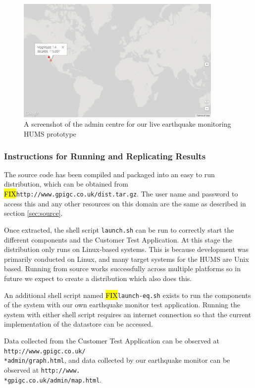 \documentclass[10pt,a4paper]{article}
\begin{document}
\begin{figure}[h!]
  \centering
  \includegraphics[width=10cm]{images/plotearthquakes.png}
  \caption{A screenshot of the admin centre for our live earthquake monitoring HUMS prototype}
  \label{fig:plotearthquakes}
\end{figure}

\subsubsection{Instructions for Running and Replicating Results}
The source code has been compiled and packaged into an easy to run distribution, which can be obtained from \hl{FIX}\verb+http://www.gpigc.co.uk/dist.tar.gz+. The user name and password to access this and any other resources on this domain are the same as described in section \ref{sec:source}.

Once extracted, the shell script \verb+launch.sh+ can be run to correctly start the different components and the Customer Test Application. At this stage the distribution only runs on Linux-based systems. This is because development was primarily conducted on Linux, and many target systems for the HUMS are Unix based. Running from source works successfully across multiple platforms so in future we expect to create a distribution which also does this.

An additional shell script named \hl{FIX}\verb+launch-eq.sh+ exists to run the components of the system with our own earthquake monitor test application. Running the system with either shell script requires an internet connection so that the current implementation of the datastore can be accessed.

Data collected from the Customer Test Application can be observed at \texttt{http://www.gpigc.co.uk/\\*admin/graph.html}, and data collected by our earthquake monitor can be observed at \texttt{http://www.\\*gpigc.co.uk/admin/map.html}.
\end{document}
